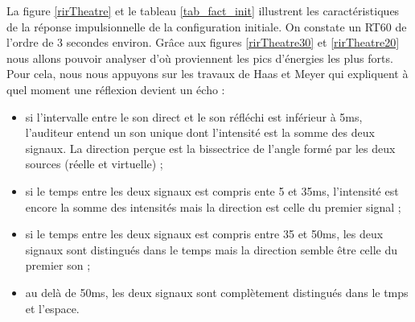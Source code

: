 La figure \ref{rirTheatre} et le tableau \ref{tab_fact_init} illustrent les caractéristiques de  la réponse impulsionnelle de la configuration initiale. On constate un \gls{RT60} de l'ordre de 3 secondes environ. Grâce aux figures \ref{rirTheatre30} et \ref{rirTheatre20} nous allons pouvoir analyser d'où proviennent les pics d'énergies les plus forts. Pour cela, nous nous appuyons sur les travaux de Haas et Meyer \cite[p.49]{haas} qui expliquent à quel moment une réflexion devient un écho :
\begin{itemize}
\item si l'intervalle entre le son direct et le son réfléchi est inférieur à 5ms, l'auditeur entend un son unique dont l'intensité est la somme des deux signaux. La direction perçue est la bissectrice de l'angle formé par les deux sources (réelle et virtuelle) ;
\item si le temps entre les deux signaux est compris ente 5 et 35ms, l'intensité est encore la somme des intensités mais la direction est celle du premier signal ;
\item si le temps entre les deux signaux est compris entre 35 et 50ms, les deux signaux sont distingués dans le temps mais la direction semble être celle du premier son ;
\item au delà de 50ms, les deux signaux sont complètement distingués dans le tmps et l'espace.
\end{itemize}
